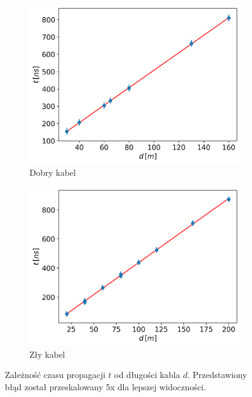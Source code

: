 \documentclass[12pt]{article}
\begin{document}
\begin{figure}[H]
  \centering
  \begin{subfigure}{0.45\textwidth}
    \includegraphics[width=\linewidth]{good_cable_distance}
    \caption{Dobry kabel}
    \label{fig:good_distance}
  \end{subfigure}\hfill
  \begin{subfigure}{0.45\textwidth}
    \includegraphics[width=\linewidth]{bad_cable_distance}
    \caption{Zły kabel}
    \label{fig:bad_distance}
  \end{subfigure}
  \caption{Zależność czasu propagacji $t$ od długości kabla $d$. Przedstawiony błąd został przeskalowany 5x dla lepszej widoczności.}
  \label{fig:distance}
\end{figure}
\end{document}
